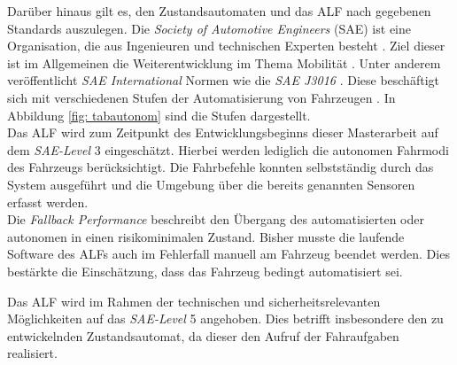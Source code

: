 	
	 
	
	Darüber hinaus gilt es, den Zustandsautomaten und das ALF nach gegebenen Standards auszulegen. Die \textit{Society of Automotive Engineers} (SAE) ist eine Organisation, die aus Ingenieuren und technischen Experten besteht \cite{saeorg}. Ziel dieser ist im Allgemeinen die Weiterentwicklung im Thema Mobilität \cite{saeorg}. Unter anderem veröffentlicht \textit{SAE International} Normen wie die \textit{SAE J3016} \cite{sae}. Diese beschäftigt sich mit verschiedenen Stufen der Automatisierung von Fahrzeugen \cite{sae}. In Abbildung \ref{fig: tabautonom} sind die Stufen dargestellt.\\
	\newpage
	Das ALF wird zum Zeitpunkt des Entwicklungsbeginns dieser Masterarbeit auf dem \textit{SAE-Level} 3 eingeschätzt. Hierbei werden lediglich die autonomen Fahrmodi des Fahrzeugs berücksichtigt. Die Fahrbefehle konnten selbstständig durch das System ausgeführt und die Umgebung über die bereits genannten Sensoren erfasst werden.\\
	
	Die \textit{Fallback Performance} beschreibt den Übergang des automatisierten oder autonomen in einen risikominimalen Zustand. Bisher musste die laufende Software des ALFs auch im Fehlerfall manuell am Fahrzeug beendet werden. Dies bestärkte die Einschätzung, dass das Fahrzeug bedingt automatisiert sei.	
	
	
	
	Das ALF wird im Rahmen der technischen und sicherheitsrelevanten Möglichkeiten auf das \textit{SAE-Level} 5 angehoben. Dies betrifft insbesondere den zu entwickelnden Zustandsautomat, da dieser den Aufruf der Fahraufgaben realisiert.\\
	  
	


		
	
		
		
				   		

